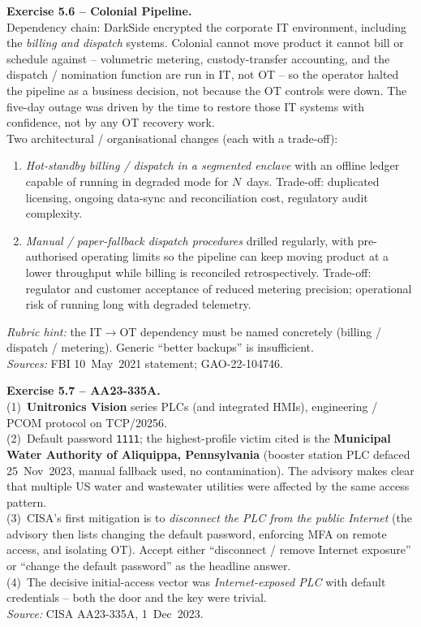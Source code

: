 \documentclass[11pt,a4paper]{article}
\begin{document}
\begin{solutionbox}
\textbf{Exercise 5.6 -- Colonial Pipeline.}\\
Dependency chain: DarkSide encrypted the corporate IT environment, including the
\emph{billing and dispatch} systems. Colonial cannot move product it cannot bill or
schedule against -- volumetric metering, custody-transfer accounting, and the dispatch /
nomination function are run in IT, not OT -- so the operator halted the pipeline as a
business decision, not because the OT controls were down. The five-day outage was driven
by the time to restore those IT systems with confidence, not by any OT recovery work.\\[2pt]
Two architectural / organisational changes (each with a trade-off):
\begin{enumerate}\setlength{\itemsep}{0pt}
  \item \emph{Hot-standby billing / dispatch in a segmented enclave} with an offline ledger
        capable of running in degraded mode for $N$~days. Trade-off: duplicated licensing,
        ongoing data-sync and reconciliation cost, regulatory audit complexity.
  \item \emph{Manual / paper-fallback dispatch procedures} drilled regularly, with
        pre-authorised operating limits so the pipeline can keep moving product at a lower
        throughput while billing is reconciled retrospectively. Trade-off: regulator and
        customer acceptance of reduced metering precision; operational risk of running
        long with degraded telemetry.
\end{enumerate}
\emph{Rubric hint:} the IT$\to$OT dependency must be named concretely (billing /
dispatch / metering). Generic ``better backups'' is insufficient.\\
\emph{Sources:} FBI 10~May~2021 statement; GAO-22-104746.
\end{solutionbox}

\begin{solutionbox}
\textbf{Exercise 5.7 -- AA23-335A.}\\
(1)~\textbf{Unitronics Vision} series PLCs (and integrated HMIs), engineering / PCOM
protocol on TCP/20256.\\
(2)~Default password \texttt{1111}; the highest-profile victim cited is the \textbf{Municipal
Water Authority of Aliquippa, Pennsylvania} (booster station PLC defaced 25~Nov~2023, manual
fallback used, no contamination). The advisory makes clear that multiple US water and
wastewater utilities were affected by the same access pattern.\\
(3)~CISA's first mitigation is to \emph{disconnect the PLC from the public Internet} (the
advisory then lists changing the default password, enforcing MFA on remote access, and
isolating OT). Accept either ``disconnect / remove Internet exposure'' or ``change the
default password'' as the headline answer.\\
(4)~The decisive initial-access vector was \emph{Internet-exposed PLC} with default
credentials -- both the door and the key were trivial.\\[2pt]
\emph{Source:} CISA AA23-335A, 1~Dec~2023.
\end{solutionbox}
\end{document}
